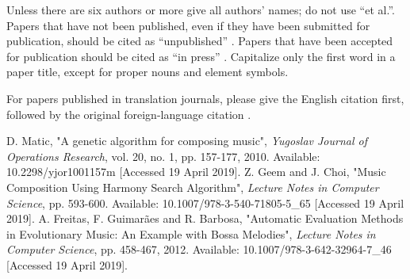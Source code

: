 \documentclass[conference]{IEEEtran}
\begin{document}
Unless there are six authors or more give all authors' names; do not use 
``et al.''. Papers that have not been published, even if they have been 
submitted for publication, should be cited as ``unpublished'' . Papers 
that have been accepted for publication should be cited as ``in press'' . 
Capitalize only the first word in a paper title, except for proper nouns and 
element symbols.

For papers published in translation journals, please give the English 
citation first, followed by the original foreign-language citation .

\begin{thebibliography}{00}
 D. Matic, "A genetic algorithm for composing music", \textit{Yugoslav Journal of Operations Research}, vol. 20, no. 1, pp. 157-177, 2010. Available: 10.2298/yjor1001157m [Accessed 19 April 2019].
 Z. Geem and J. Choi, "Music Composition Using Harmony Search Algorithm", \textit{Lecture Notes in Computer Science}, pp. 593-600. Available: 10.1007/978-3-540-71805-5\_65 [Accessed 19 April 2019].
 A. Freitas, F. Guimarães and R. Barbosa, "Automatic Evaluation Methods in Evolutionary Music: An Example with Bossa Melodies", \textit{Lecture Notes in Computer Science}, pp. 458-467, 2012. Available: 10.1007/978-3-642-32964-7\_46 [Accessed 19 April 2019].
\end{thebibliography}
\end{document}
